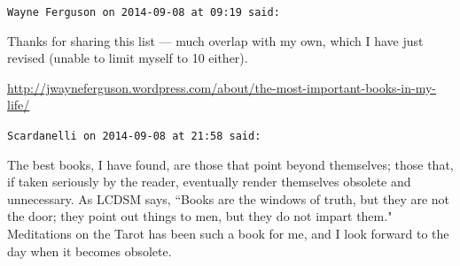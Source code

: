 \begin{footnotesize}\begin{sffamily}



\texttt{Wayne Ferguson on 2014-09-08 at 09:19 said: }

Thanks for sharing this list — much overlap with my own, which I have just revised (unable to limit myself to 10 either).

\url{http://jwayneferguson.wordpress.com/about/the-most-important-books-in-my-life/}


\hfill

\texttt{Scardanelli on 2014-09-08 at 21:58 said: }

The best books, I have found, are those that point beyond themselves; those that, if taken seriously by the reader, eventually render themselves obsolete and unnecessary. As LCDSM says, ``Books are the windows of truth, but they are not the door; they point out things to men, but they do not impart them." Meditations on the Tarot has been such a book for me, and I look forward to the day when it becomes obsolete.


\hfill


\end{sffamily}\end{footnotesize}
